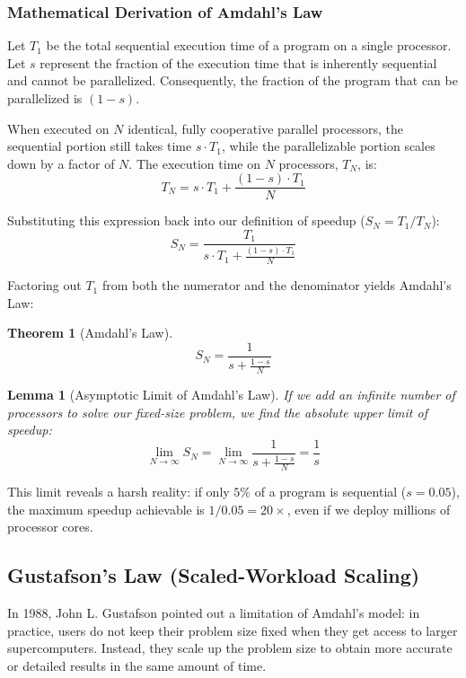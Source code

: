 \documentclass[12pt,a4paper,openany]{book}
\newtheorem{theorem}{Theorem}[chapter]
\newtheorem{lemma}{Lemma}[chapter]
\begin{document}
\subsubsection{Mathematical Derivation of Amdahl's Law}
Let $T_1$ be the total sequential execution time of a program on a single processor. Let $s$ represent the fraction of the execution time that is inherently sequential and cannot be parallelized. Consequently, the fraction of the program that can be parallelized is $(1 - s)$.

When executed on $N$ identical, fully cooperative parallel processors, the sequential portion still takes time $s \cdot T_1$, while the parallelizable portion scales down by a factor of $N$. The execution time on $N$ processors, $T_N$, is:
\begin{equation}
    T_N = s \cdot T_1 + \frac{(1 - s) \cdot T_1}{N}
\end{equation}

Substituting this expression back into our definition of speedup ($S_N = T_1 / T_N$):
\begin{equation}
    S_N = \frac{T_1}{s \cdot T_1 + \frac{(1 - s) \cdot T_1}{N}}
\end{equation}

Factoring out $T_1$ from both the numerator and the denominator yields Amdahl's Law:
\begin{theorem}[Amdahl's Law]
    \begin{equation}
        S_N = \frac{1}{s + \frac{1 - s}{N}}
    \end{equation}
\end{theorem}

\begin{lemma}[Asymptotic Limit of Amdahl's Law]
    If we add an infinite number of processors to solve our fixed-size problem, we find the absolute upper limit of speedup:
    \begin{equation}
        \lim_{N \to \infty} S_N = \lim_{N \to \infty} \frac{1}{s + \frac{1-s}{N}} = \frac{1}{s}
    \end{equation}
\end{lemma}

This limit reveals a harsh reality: if only $5\%$ of a program is sequential ($s = 0.05$), the maximum speedup achievable is $1 / 0.05 = 20\times$, even if we deploy millions of processor cores.

\subsection{Gustafson's Law (Scaled-Workload Scaling)}
In 1988, John L. Gustafson pointed out a limitation of Amdahl's model: in practice, users do not keep their problem size fixed when they get access to larger supercomputers. Instead, they scale up the problem size to obtain more accurate or detailed results in the same amount of time.
\end{document}
